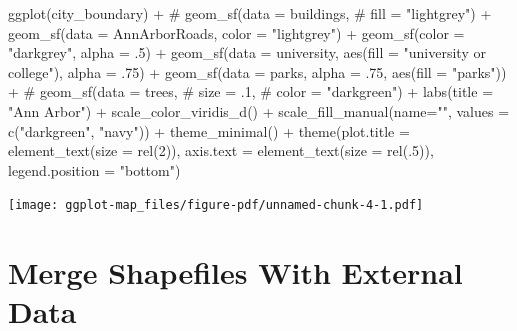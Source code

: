 \documentclass[
  letterpaper,
  DIV=11,
  numbers=noendperiod,
  oneside]{scrreprt}
\newenvironment{Shaded}{\begin{snugshade}}{\end{snugshade}}
\newcommand{\AttributeTok}[1]{\textcolor[rgb]{0.40,0.45,0.13}{#1}}
\newcommand{\CommentTok}[1]{\textcolor[rgb]{0.37,0.37,0.37}{#1}}
\newcommand{\DecValTok}[1]{\textcolor[rgb]{0.68,0.00,0.00}{#1}}
\newcommand{\FunctionTok}[1]{\textcolor[rgb]{0.28,0.35,0.67}{#1}}
\newcommand{\NormalTok}[1]{\textcolor[rgb]{0.00,0.23,0.31}{#1}}
\newcommand{\SpecialCharTok}[1]{\textcolor[rgb]{0.37,0.37,0.37}{#1}}
\newcommand{\StringTok}[1]{\textcolor[rgb]{0.13,0.47,0.30}{#1}}
\begin{document}
\begin{Shaded}
\begin{Highlighting}[]
\FunctionTok{ggplot}\NormalTok{(city\_boundary) }\SpecialCharTok{+}
  \CommentTok{\# geom\_sf(data = buildings,}
  \CommentTok{\#         fill = "lightgrey") +}
  \FunctionTok{geom\_sf}\NormalTok{(}\AttributeTok{data =}\NormalTok{ AnnArborRoads, }
          \AttributeTok{color =} \StringTok{"lightgrey"}\NormalTok{) }\SpecialCharTok{+}
  \FunctionTok{geom\_sf}\NormalTok{(}\AttributeTok{color =} \StringTok{"darkgrey"}\NormalTok{, }\AttributeTok{alpha =}\NormalTok{ .}\DecValTok{5}\NormalTok{) }\SpecialCharTok{+}
  \FunctionTok{geom\_sf}\NormalTok{(}\AttributeTok{data =}\NormalTok{ university, }
          \FunctionTok{aes}\NormalTok{(}\AttributeTok{fill =} \StringTok{"university or college"}\NormalTok{), }
          \AttributeTok{alpha =}\NormalTok{ .}\DecValTok{75}\NormalTok{) }\SpecialCharTok{+} 
  \FunctionTok{geom\_sf}\NormalTok{(}\AttributeTok{data =}\NormalTok{ parks, }
          \AttributeTok{alpha =}\NormalTok{ .}\DecValTok{75}\NormalTok{,}
          \FunctionTok{aes}\NormalTok{(}\AttributeTok{fill =} \StringTok{"parks"}\NormalTok{)) }\SpecialCharTok{+}
  \CommentTok{\# geom\_sf(data = trees, }
  \CommentTok{\#         size = .1,}
  \CommentTok{\#         color = "darkgreen") +}
  \FunctionTok{labs}\NormalTok{(}\AttributeTok{title =} \StringTok{"Ann Arbor"}\NormalTok{) }\SpecialCharTok{+}
  \FunctionTok{scale\_color\_viridis\_d}\NormalTok{() }\SpecialCharTok{+}
  \FunctionTok{scale\_fill\_manual}\NormalTok{(}\AttributeTok{name=}\StringTok{""}\NormalTok{,}
                    \AttributeTok{values =} \FunctionTok{c}\NormalTok{(}\StringTok{"darkgreen"}\NormalTok{, }\StringTok{"navy"}\NormalTok{)) }\SpecialCharTok{+}
  \FunctionTok{theme\_minimal}\NormalTok{() }\SpecialCharTok{+}
  \FunctionTok{theme}\NormalTok{(}\AttributeTok{plot.title =} \FunctionTok{element\_text}\NormalTok{(}\AttributeTok{size =} \FunctionTok{rel}\NormalTok{(}\DecValTok{2}\NormalTok{)), }
        \AttributeTok{axis.text =} \FunctionTok{element\_text}\NormalTok{(}\AttributeTok{size =} \FunctionTok{rel}\NormalTok{(.}\DecValTok{5}\NormalTok{)),}
        \AttributeTok{legend.position =} \StringTok{"bottom"}\NormalTok{) }
\end{Highlighting}
\end{Shaded}

\texttt{[image: ggplot-map\_files/figure-pdf/unnamed-chunk-4-1.pdf]}

\chapter{Merge Shapefiles With External Data}\label{sec-merging}
\end{document}
